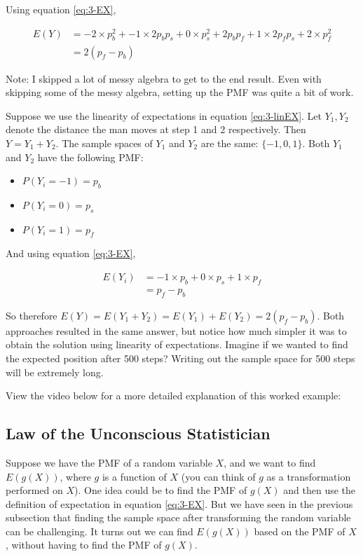 \documentclass[
]{book}
\providecommand{\tightlist}{%
  \setlength{\itemsep}{0pt}\setlength{\parskip}{0pt}}
\begin{document}
Using equation \eqref{eq:3-EX},

\[
\begin{split}
E(Y) &= -2 \times p_b^2 + -1 \times 2p_b p_s + 0 \times p_s^2 + 2 p_b p_f + 1 \times 2p_f p_s + 2 \times p_f^2 \\
       &= 2 (p_f - p_b)
\end{split}
\]

Note: I skipped a lot of messy algebra to get to the end result. Even with skipping some of the messy algebra, setting up the PMF was quite a bit of work.

Suppose we use the linearity of expectations in equation \eqref{eq:3-linEX}. Let \(Y_1, Y_2\) denote the distance the man moves at step 1 and 2 respectively. Then \(Y = Y_1 + Y_2\). The sample spaces of \(Y_1\) and \(Y_2\) are the same: \(\{-1,0,1\}\). Both \(Y_1\) and \(Y_2\) have the following PMF:

\begin{itemize}
\tightlist
\item
  \(P(Y_i = -1) = p_b\)
\item
  \(P(Y_i = 0) = p_s\)
\item
  \(P(Y_i = 1) = p_f\)
\end{itemize}

And using equation \eqref{eq:3-EX},

\[
\begin{split}
E(Y_i) &= -1 \times p_b + 0 \times p_s + 1 \times p_f \\
       &= p_f - p_b
\end{split}
\]

So therefore \(E(Y) = E(Y_1 + Y_2) = E(Y_1) + E(Y_2) = 2(p_f - p_b)\). Both approaches resulted in the same answer, but notice how much simpler it was to obtain the solution using linearity of expectations. Imagine if we wanted to find the expected position after 500 steps? Writing out the sample space for 500 steps will be extremely long.

View the video below for a more detailed explanation of this worked example:

\hypertarget{law-of-the-unconscious-statistician}{%
\subsection{Law of the Unconscious Statistician}\label{law-of-the-unconscious-statistician}}

Suppose we have the PMF of a random variable \(X\), and we want to find \(E(g(X))\), where \(g\) is a function of \(X\) (you can think of \(g\) as a transformation performed on \(X\)). One idea could be to find the PMF of \(g(X)\) and then use the definition of expectation in equation \eqref{eq:3-EX}. But we have seen in the previous subsection that finding the sample space after transforming the random variable can be challenging. It turns out we can find \(E(g(X))\) based on the PMF of \(X\), without having to find the PMF of \(g(X)\).
\end{document}
